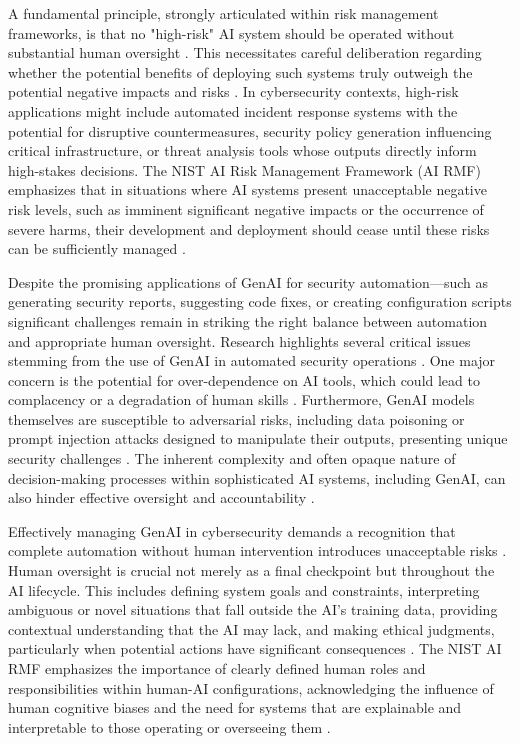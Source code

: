 A fundamental principle, strongly articulated within risk management frameworks, is that no "high-risk" AI system should be operated without substantial human oversight \cite[p.7]{tabassi_artificial_2023}. This necessitates careful deliberation regarding whether the potential benefits of deploying such systems truly outweigh the potential negative impacts and risks \cite{tabassi_artificial_2023}. In cybersecurity contexts, high-risk applications might include automated incident response systems with the potential for disruptive countermeasures, security policy generation influencing critical infrastructure, or threat analysis tools whose outputs directly inform high-stakes decisions. The NIST AI Risk Management Framework (AI RMF) emphasizes that in situations where AI systems present unacceptable negative risk levels, such as imminent significant negative impacts or the occurrence of severe harms, their development and deployment should cease until these risks can be sufficiently managed \cite{tabassi_artificial_2023}.

Despite the promising applications of GenAI for security automation—such as generating security reports, suggesting code fixes, or creating configuration scripts significant challenges remain in striking the right balance between automation and appropriate human oversight. Research highlights several critical issues stemming from the use of GenAI in automated security operations \cite{patel_generative_2025}. One major concern is the potential for over-dependence on AI tools, which could lead to complacency or a degradation of human skills \cite{patel_generative_2025}. Furthermore, GenAI models themselves are susceptible to adversarial risks, including data poisoning or prompt injection attacks designed to manipulate their outputs, presenting unique security challenges \cite{patel_generative_2025}. The inherent complexity and often opaque nature of decision-making processes within sophisticated AI systems, including GenAI, can also hinder effective oversight and accountability \cite{tabassi_artificial_2023} \cite{patel_generative_2025}.

Effectively managing GenAI in cybersecurity demands a recognition that complete automation without human intervention introduces unacceptable risks \cite{patel_generative_2025}. Human oversight is crucial not merely as a final checkpoint but throughout the AI lifecycle. This includes defining system goals and constraints, interpreting ambiguous or novel situations that fall outside the AI's training data, providing contextual understanding that the AI may lack, and making ethical judgments, particularly when potential actions have significant consequences \cite{tabassi_artificial_2023}. The NIST AI RMF emphasizes the importance of clearly defined human roles and responsibilities within human-AI configurations, acknowledging the influence of human cognitive biases and the need for systems that are explainable and interpretable to those operating or overseeing them \cite{tabassi_artificial_2023}.

